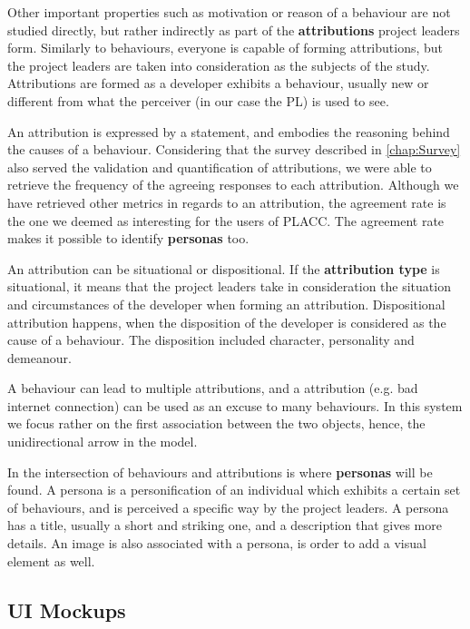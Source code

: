 Other important properties such as motivation or reason of a behaviour are not studied directly, but rather indirectly as part of the \textbf{attributions} project leaders form. Similarly to behaviours, everyone is capable of forming attributions, but the project leaders are taken into consideration as the subjects of the study. Attributions are formed as a developer exhibits a behaviour, usually new or different from what the perceiver (in our case the PL) is used to see. 

An attribution is expressed by a statement, and embodies the reasoning behind the causes of a behaviour. Considering that the survey described in \autoref{chap:Survey} also served the validation and quantification of attributions, we were able to retrieve the frequency of the agreeing responses to each attribution. Although we have retrieved other metrics in regards to an attribution, the agreement rate is the one we deemed as interesting for the users of PLACC. The agreement rate makes it possible to identify \textbf{personas} too.

An attribution can be situational or dispositional. If the \textbf{attribution type }is situational, it means that the project leaders take in consideration the situation and circumstances of the developer when forming an attribution. Dispositional attribution happens, when the disposition of the developer is considered as the cause of a behaviour. The disposition included character, personality and demeanour.

A behaviour can lead to multiple attributions, and a attribution (e.g. bad internet connection) can be used as an excuse to many behaviours. In this system we focus rather on the first association between the two objects, hence, the unidirectional arrow in the model. 

In the intersection of behaviours and attributions is where \textbf{personas} will be found. A persona is a personification of an individual which exhibits a certain set of behaviours, and is perceived a specific way by the project leaders. A persona has a title, usually a short and striking one, and a description that gives more details. An image is also associated with a persona, is order to add a visual element as well.   

\subsection{UI Mockups}

